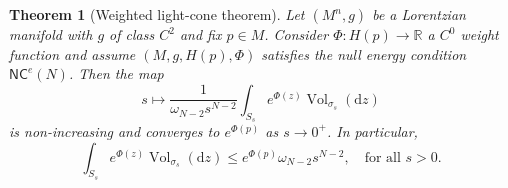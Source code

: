 \documentclass[12pt,a4paper]{amsart}
\theoremstyle{plain}
\newtheorem{theorem}[lemma]{Theorem}
\theoremstyle{definition}
\numberwithin{equation}{section}
\newcommand{\R}{\mathbb{R}}
\DeclareMathOperator{\vol}{Vol}
\newcommand{\de}{{\mathrm{d}}}
\newcommand{\NC}{\mathsf{NC}}
\begin{document}
\begin{theorem}[Weighted light-cone theorem]
\label{T:WLCT}
Let $(M^n,g)$ be a Lorentzian manifold with $g$ of class $C^2$ and fix $p \in M$. 
Consider $\Phi : H(p) \to \R$
a $C^0$ weight function and assume 
$(M,g,H(p),\Phi)$ satisfies the null energy condition $\NC^e(N)$. 
Then the map 
%
\begin{equation}\label{E:lct}
s \mapsto 
\frac{1}{\omega_{N-2} s^{N-2}}
\int_{S_s}e^{\Phi(z)}
\vol_{\sigma_s}(\de z)
\end{equation}
%
is non-increasing and converges to $e^{\Phi(p)}$ as $s\to 0^+$.
In particular, 
%
\begin{equation}\label{eq:CompAreaCone}
\int_{S_s}e^{\Phi(z)}
\vol_{\sigma_s}(\de z)
\leq 
e^{\Phi(p)}\omega_{N-2}s^{N-2}, \quad \text{for all } s>0.
\end{equation}
\end{theorem}
\end{document}
